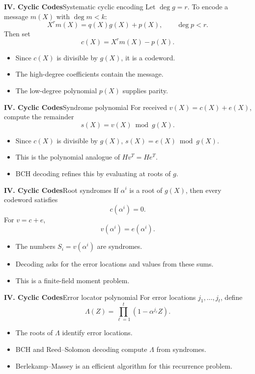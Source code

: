 \begin{frame}{\textbf{IV. Cyclic Codes}}{Systematic cyclic encoding}
\small
Let $\deg g=r$. To encode a message $m(X)$ with $\deg m<k$:
\[
  X^r m(X)=q(X)g(X)+p(X),\qquad \deg p<r.
\]
Then set
\[
  c(X)=X^rm(X)-p(X).
\]
\begin{itemize}
  \item Since $c(X)$ is divisible by $g(X)$, it is a codeword.
  \item The high-degree coefficients contain the message.
  \item The low-degree polynomial $p(X)$ supplies parity.
\end{itemize}
\end{frame}

\begin{frame}{\textbf{IV. Cyclic Codes}}{Syndrome polynomial}
\small
For received $v(X)=c(X)+e(X)$, compute the remainder
\[
  s(X)=v(X)\bmod g(X).
\]
\begin{itemize}
  \item Since $c(X)$ is divisible by $g(X)$, $s(X)=e(X)\bmod g(X)$.
  \item This is the polynomial analogue of $Hv^T=He^T$.
  \item BCH decoding refines this by evaluating at roots of $g$.
\end{itemize}
\end{frame}

\begin{frame}{\textbf{IV. Cyclic Codes}}{Root syndromes}
\small
If $\alpha^i$ is a root of $g(X)$, then every codeword satisfies
\[
  c(\alpha^i)=0.
\]
For $v=c+e$,
\[
  v(\alpha^i)=e(\alpha^i).
\]
\begin{itemize}
  \item The numbers $S_i=v(\alpha^i)$ are syndromes.
  \item Decoding asks for the error locations and values from these sums.
  \item This is a finite-field moment problem.
\end{itemize}
\end{frame}

\begin{frame}{\textbf{IV. Cyclic Codes}}{Error locator polynomial}
\small
For error locations $j_1,\ldots,j_t$, define
\[
  \Lambda(Z)=\prod_{\ell=1}^t(1-\alpha^{j_\ell}Z).
\]
\begin{itemize}
  \item The roots of $\Lambda$ identify error locations.
  \item BCH and Reed--Solomon decoding compute $\Lambda$ from syndromes.
  \item Berlekamp--Massey is an efficient algorithm for this recurrence problem.
\end{itemize}
\end{frame}

